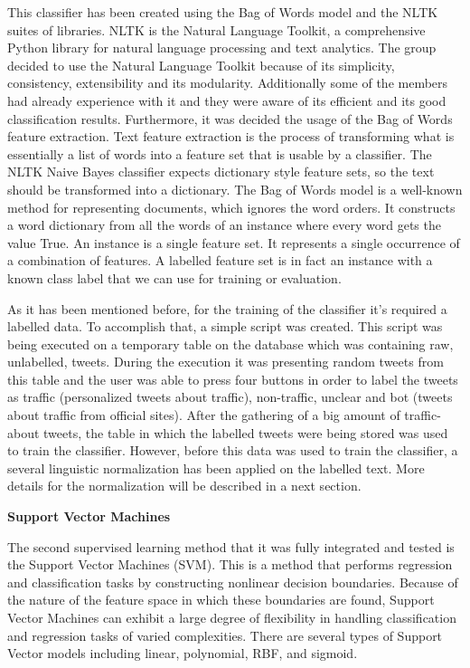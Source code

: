 This classifier has been created using the Bag of Words model and the NLTK suites of libraries. NLTK is the Natural Language Toolkit, a comprehensive Python library for natural language processing and text analytics. The group decided to use the Natural Language Toolkit because of its simplicity, consistency, extensibility and its modularity. Additionally some of the members had already experience with it and they were aware of its efficient and its good classification results. Furthermore, it was decided the usage of the Bag of Words feature extraction. Text feature extraction is the process of transforming what is essentially a list of words into a feature set that is usable by a classifier. The NLTK Naive Bayes classifier expects dictionary style feature sets, so the text should be transformed into a dictionary. The Bag of Words model is a well-known method for representing documents, which ignores the word orders. It constructs a word dictionary from all the words of an instance where every word gets the value True. An instance is a single feature set. It represents a single occurrence of a combination of features. A labelled feature set is in fact an instance with a known class label that we can use for training or evaluation.

As it has been mentioned before, for the training of the classifier it’s required a labelled data. To accomplish that, a simple script was created. This script was being executed on a temporary table on the database which was containing raw, unlabelled, tweets. During the execution it was presenting random tweets from this table and the user was able to press four buttons in order to label the tweets as traffic (personalized tweets about traffic), non-traffic, unclear and bot (tweets about traffic from official sites). After the gathering of a big amount of traffic-about tweets, the table in which the labelled tweets were being stored was used to train the classifier. However, before this data was used to train the classifier, a several linguistic normalization has been applied on the labelled text.  More details for the normalization will be described in a next section.

\textbf{Support Vector Machines}

The second supervised learning method that it was fully integrated and tested is the Support Vector Machines (SVM). This is a method that performs regression and classification tasks by constructing nonlinear decision boundaries. Because of the nature of the feature space in which these boundaries are found, Support Vector Machines can exhibit a large degree of flexibility in handling classification and regression tasks of varied complexities. There are several types of Support Vector models including linear, polynomial, RBF, and sigmoid.

